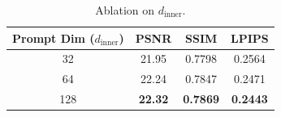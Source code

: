 \begin{table}[ht]
\centering
\begin{tabular}{c|ccc}
\toprule
Prompt Dim ($d_{\text{inner}}$) & PSNR & SSIM  & LPIPS \\
\midrule
32   & 21.95 & 0.7798 & 0.2564 \\
64   & 22.24 & 0.7847 & 0.2471 \\
128  & \textbf{22.32} & \textbf{0.7869} & \textbf{0.2443} \\
\bottomrule
\end{tabular}
\caption{Ablation on $d_{\text{inner}}$.}
\label{tab:prompt_dim}
\end{table}


% 

% 